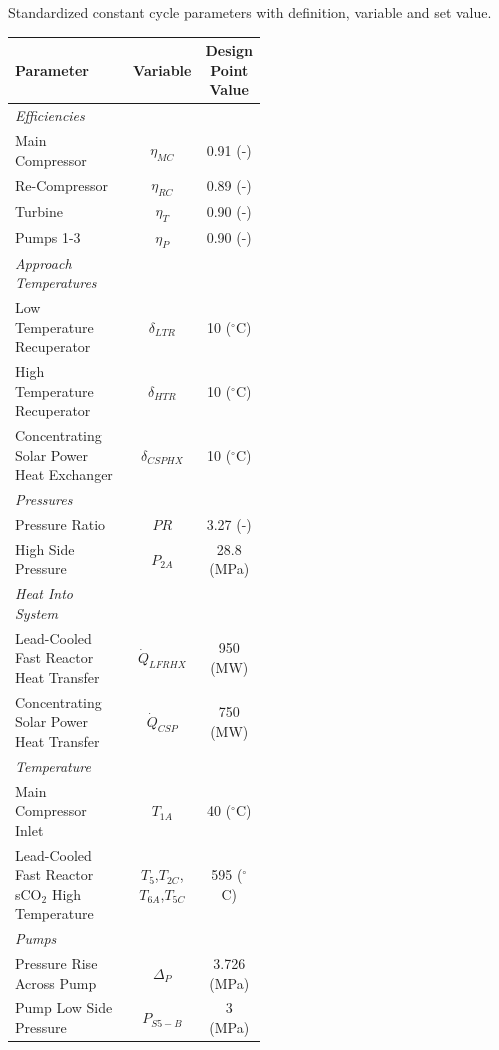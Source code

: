 \begin{specialtable}[H] 
    \caption{Standardized constant cycle parameters with definition, variable and set value. \label{tab-cycle-constants}}
    \begin{tabular}{L{0.5\linewidth}cc}
    \toprule
    \textbf{Parameter} & \textbf{Variable}	& \textbf{Design Point Value}\\
    \midrule
    \textit{Efficiencies}\\
    Main Compressor & $\eta_{MC}$		& 0.91 (-)\\
    Re-Compressor & $\eta_{RC}$		& 0.89 (-)\\
    Turbine & $\eta_{T}$		& 0.90 (-)\\
    Pumps 1-3 & $\eta_{P}$      & 0.90 (-)\\
    \midrule
    \textit{Approach Temperatures}\\
    Low Temperature Recuperator & $\delta_{LTR}$		& 10 ($^{\circ}$C)\\
    High Temperature Recuperator & $\delta_{HTR}$		& 10 ($^{\circ}$C)\\
    Concentrating Solar Power Heat Exchanger & $\delta_{CSPHX}$	& 10 ($^{\circ}$C)\\
    \midrule
    \textit{Pressures}\\
    Pressure Ratio & $PR$ & 3.27 (-)\\
    High Side Pressure & $P_{2A}$ & 28.8 (MPa)\\
    \midrule
    \textit{Heat Into System}\\
    Lead-Cooled Fast Reactor Heat Transfer & $\dot{Q}_{LFRHX}$ & 950 (MW)\\
    Concentrating Solar Power Heat Transfer & $\dot{Q}_{CSP}$ & 750 (MW)\\
    \midrule
    \textit{Temperature}\\
    Main Compressor Inlet & $T_{1A}$ & 40 ($^{\circ}$C)\\
    Lead-Cooled Fast Reactor sCO$_{2}$ High Temperature & $T_{5}$,$T_{2C}$,$T_{6A}$,$T_{5C}$ & 595 ($^{\circ}$C)\\
    \midrule
    \textit{Pumps}\\
    Pressure Rise Across Pump & $\Delta_{P}$ & 3.726 (MPa)\\
    Pump Low Side Pressure & $P_{S5-B}$ & 3 (MPa)\\ 
    \bottomrule
    \end{tabular}
\end{specialtable}

